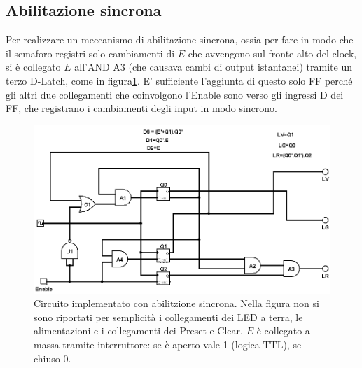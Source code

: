 \documentclass[10pt,a4paper]{article}
\begin{document}
\subsection{Abilitazione sincrona}
Per realizzare un meccanismo di abilitazione sincrona, ossia per fare in modo che il semaforo registri solo cambiamenti di $E$ che avvengono sul fronte alto del clock, si è collegato $E$ all'AND A3 (che causava cambi di output istantanei) tramite un terzo D-Latch, come in figura\ref{fig:circcompletesincrono}.
E' sufficiente l'aggiunta di questo solo FF perché gli altri due collegamenti che coinvolgono l'Enable sono verso gli ingressi D dei FF, che registrano i cambiamenti degli input in modo sincrono.
\begin{figure}[!htb]
\centering
\includegraphics[scale=0.5]{circcompletesincrono.png}
\caption{Circuito implementato con abilitzione sincrona. Nella figura non si sono riportati per semplicità i collegamenti dei LED a terra, le alimentazioni e i collegamenti dei Preset e Clear. $E$ è collegato a massa tramite interruttore: se è aperto vale 1 (logica TTL), se chiuso 0.\label{fig:circcompletesincrono}}
\end{figure}

\end{document}
